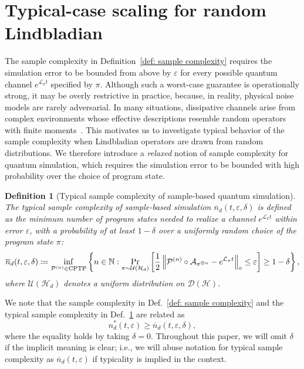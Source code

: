 \documentclass[superscriptaddress,amsmath,amssymb,aps,pra,letterpaper,tightenlines,notitlepages,12pt]{revtex4-2}
\newtheorem{definition}[theorem]{Definition}
\begin{document}
\section{Typical-case scaling for random Lindbladian} \label{sec:average-case}
The sample complexity in Definition~\ref{def: sample complexity} requires the simulation error to be bounded from above by $\varepsilon$ for every possible quantum channel $e^{\mathcal{L}_{\pi}t}$ specified by $\pi$. Although such a worst-case guarantee is operationally strong, it may be overly restrictive in practice, because, in reality, physical noise models are rarely adversarial. In many situations, dissipative channels arise from complex environments whose effective descriptions resemble random operators with finite moments~\cite{rigol2008ThermalizationItsMechanism, bruzda2009RandomQuantumOperations, denisov2019UniversalSpectraRandom, kukulski2021GeneratingRandomQuantum, sa2020SpectralSteadystateProperties, chruscinski2025SpectralDelineationMarkov, moske2025RandomMatrixPerspective}. This motivates us to investigate typical behavior of the sample complexity when Lindbladian operators are drawn from random distributions. We therefore introduce a \emph{relaxed} notion of sample complexity for quantum simulation, which requires the simulation error to be bounded with high probability over the choice of program state. 
\begin{definition}[Typical sample complexity of sample-based quantum simulation]
\label{def: approx sample complexity}
The typical sample complexity of sample-based simulation $\overline{n}_d(t,\varepsilon,\delta)$ is defined as the minimum number of program states needed to realize a channel  $e^{\mathcal{L}_{\pi}t}$ within error $\varepsilon$, with a probability of at least $1-\delta$ over a uniformly random choice of the program state $\pi$:
\begin{equation}
    \overline{n}_d(t,\varepsilon,\delta) \coloneqq \inf_{\mathcal{P}^{(n)}\in\rm{CPTP}
    }\left\{  n\in\mathbb{N}:\Pr_{\pi\sim\mathcal{U}(\mathcal{H}_d)} \left[ \frac{1}{2}\left\Vert \mathcal{P}^{(n)}
    \circ\mathcal{A}_{\pi^{\otimes n}}-e^{\mathcal{L}_{\pi}t}\right\Vert
    _{\diamond}\leq\varepsilon \right] \geq 1-\delta \right\},
\end{equation}
where $\mathcal{U}(\mathcal{H}_d)$ denotes a uniform distribution on $\mathcal{D}(\mathcal{H})$.
\end{definition}

We note that the sample complexity in Def.~\ref{def: sample complexity} and the typical sample complexity in Def.~\ref{def: approx sample complexity} are related as
\begin{equation}
    n^{\ast}_d(t,\varepsilon)\geq \overline{n}_d(t,\varepsilon,\delta),
\end{equation}
where the equality holds by taking $\delta = 0$. Throughout this paper, we will omit $\delta$ if the implicit meaning is clear; i.e., we will abuse notation for typical sample complexity as $\overline{n}_d(t,\varepsilon)$ if typicality is implied in the context.
\end{document}
